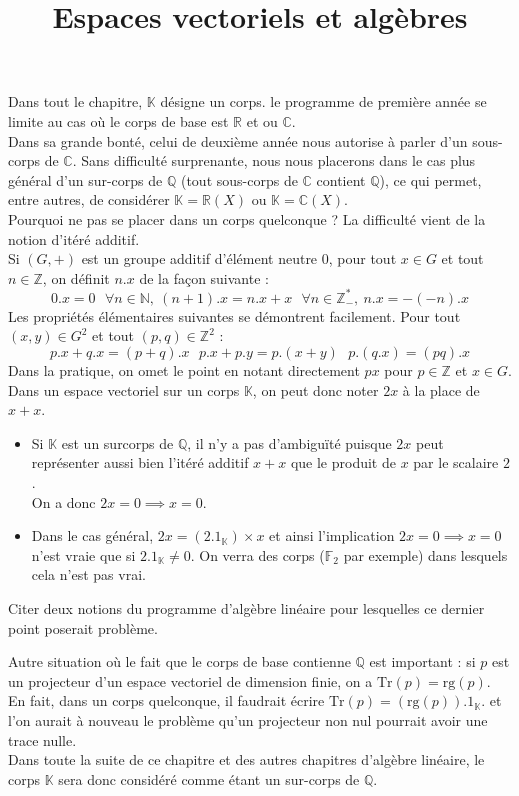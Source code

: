 \documentclass[french]{article}
\title{Espaces vectoriels et algèbres}
\date{}
\newcommand{\N}{\mathbb{N}}
\newcommand{\Z}{\mathbb{Z}}
\newcommand{\Q}{\mathbb{Q}}
\newcommand{\R}{\mathbb{R}}
\newcommand{\C}{\mathbb{C}}
\newcommand{\K}{\mathbb{K}}
\newcommand{\st}{^*}
\newcommand{\F}{\mathbb{F}}
\newcommand{\Tr}{\text{Tr}}
\newcommand{\rg}{\text{rg}}
\theoremstyle{plain}
\theoremstyle{definition}
\theoremstyle{remark}
\begin{document}
\tableofcontents

\newpage
\maketitle
Dans tout le chapitre, $\K$ désigne un corps. le programme de première année se limite au cas où le corps de base est $\R$ et ou $\C$. \\
Dans sa grande bonté, celui de deuxième année nous autorise à parler d'un sous-corps de $\C$. Sans difficulté surprenante, nous nous placerons dans le cas plus général d'un sur-corps de $\Q$ (tout sous-corps de $\C$ contient $\Q$), ce qui permet, entre autres, de considérer $\K=\R(X)$ ou $\K=\C(X)$. \\
Pourquoi ne pas se placer dans un corps quelconque ? La difficulté vient de la notion d'itéré additif. \\
Si $(G,+)$ est un groupe additif d'élément neutre $0$, pour tout $x\in G$ et tout $n\in\Z$, on définit $n.x$ de la façon suivante : $$0.x=0\ \ \ \forall n\in\N,\ (n+1).x=n.x+x\ \ \ \forall n\in\Z_-\st,\ n.x=-(-n).x$$ Les propriétés élémentaires suivantes se démontrent facilement. Pour tout $(x,y)\in G^2$ et tout $(p,q)\in\Z^2$ : $$p.x+q.x=(p+q).x\ \ \ p.x+p.y=p.(x+y)\ \ \ p.(q.x)=(pq).x$$ Dans la pratique, on omet le point en notant directement $px$ pour $p\in\Z$ et $x\in G$. \\
Dans un espace vectoriel sur un corps $\K$, on peut donc noter $2x$ à la place de $x+x$.
\begin{itemize}
	\item Si $\K$ est un surcorps de $\Q$, il n'y a pas d'ambiguïté puisque $2x$ peut représenter aussi bien l'itéré additif $x+x$ que le produit de $x$ par le scalaire $2$.\\
	On a donc $2x=0\implies x=0$.
	\item Dans le cas général, $2x=(2.1_\K)\times x$ et ainsi l'implication $2x=0\implies x=0$ n'est vraie que si $2.1_\K\ne 0$. On verra des corps ($\F_2$ par exemple) dans lesquels cela n'est pas vrai.
\end{itemize}

\begin{exo}
	Citer deux notions du programme d'algèbre linéaire pour lesquelles ce dernier point poserait problème.
\end{exo}

Autre situation où le fait que le corps de base contienne $\Q$ est important : si $p$ est un projecteur d'un espace vectoriel de dimension finie, on a $\Tr(p)=\rg(p)$. En fait, dans un corps quelconque, il faudrait écrire $\Tr(p)=(\rg(p)).1_\K$. et l'on aurait à nouveau le problème qu'un projecteur non nul pourrait avoir une trace nulle. \\
Dans toute la suite de ce chapitre et des autres chapitres d'algèbre linéaire, le corps $\K$ sera donc considéré comme étant un sur-corps de $\Q$.
\end{document}
